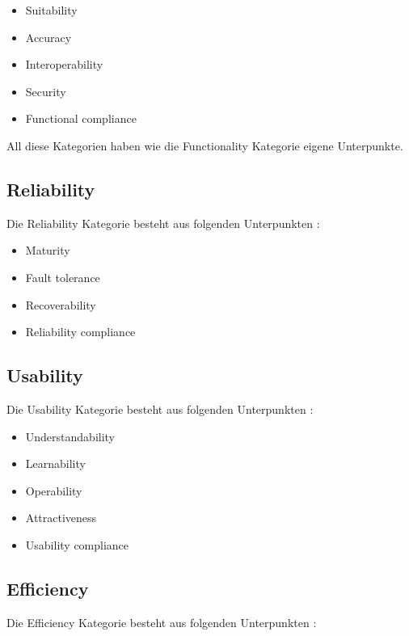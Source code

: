 \begin{itemize}
  \item \glqq Suitability\grqq
  \item \glqq Accuracy\grqq
  \item \glqq Interoperability\grqq
  \item \glqq Security\grqq
  \item \glqq Functional compliance\grqq
\end{itemize}

All diese Kategorien haben wie die Functionality Kategorie eigene Unterpunkte.

\subsection{Reliability}
Die Reliability Kategorie besteht aus folgenden Unterpunkten \cite[S. 7]{ISO_SQ}:

\begin{itemize}
  \item \glqq Maturity\grqq
  \item \glqq Fault tolerance\grqq
  \item \glqq Recoverability\grqq
  \item \glqq Reliability compliance\grqq
\end{itemize}

\cite[S. 8-9]{ISO_SQ}

\subsection{Usability}
Die Usability Kategorie besteht aus folgenden Unterpunkten \cite[S. 7]{ISO_SQ}:

\begin{itemize}
  \item \glqq Understandability\grqq
  \item \glqq Learnability\grqq
  \item \glqq Operability\grqq
  \item \glqq Attractiveness\grqq
  \item \glqq Usability compliance\grqq
\end{itemize}

\cite[S. 9-10]{ISO_SQ}

\subsection{Efficiency}
Die Efficiency Kategorie besteht aus folgenden Unterpunkten \cite[S. 7]{ISO_SQ}:

